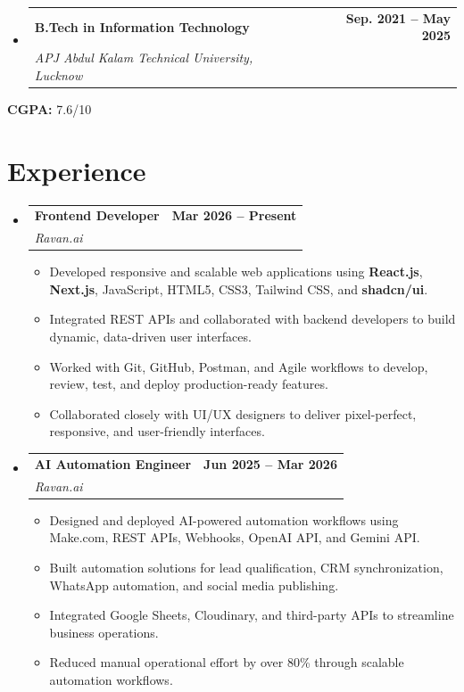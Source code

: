 \documentclass[letterpaper,11pt]{article}
\makeatletter
\newcommand{\resumeItem}[1]{
\item\small{{#1 \vspace{-2pt}}}
}
\newcommand{\resumeSubheading}[4]{
\vspace{-2pt}\item
\begin{tabular*}{1.0\textwidth}[t]{l@{\extracolsep{\fill}}r}
\textbf{#1} & \textbf{\small #2} \\
\textit{\small #3} & \textit{\small #4} \\
\end{tabular*}\vspace{-7pt}
}
\newcommand{\resumeSubHeadingListStart}{\begin{itemize}[leftmargin=0.0in,label={}]}
\newcommand{\resumeSubHeadingListEnd}{\end{itemize}}
\newcommand{\resumeItemListStart}{\begin{itemize}}
\newcommand{\resumeItemListEnd}{\end{itemize}\vspace{-5pt}}
\makeatother
\begin{document}
\resumeSubHeadingListStart

\resumeSubheading
{B.Tech in Information Technology}
{Sep. 2021 -- May 2025}
{APJ Abdul Kalam Technical University, Lucknow}
{}

\resumeSubHeadingListEnd

\textbf{CGPA:} 7.6/10


\section{Experience}

\resumeSubHeadingListStart

\resumeSubheading
{Frontend Developer}{Mar 2026 -- Present}
{Ravan.ai}{}

\resumeItemListStart

\resumeItem{Developed responsive and scalable web applications using \textbf{React.js}, \textbf{Next.js}, JavaScript, HTML5, CSS3, Tailwind CSS, and \textbf{shadcn/ui}.}
\resumeItem{Integrated REST APIs and collaborated with backend developers to build dynamic, data-driven user interfaces.}
\resumeItem{Worked with Git, GitHub, Postman, and Agile workflows to develop, review, test, and deploy production-ready features.}
\resumeItem{Collaborated closely with UI/UX designers to deliver pixel-perfect, responsive, and user-friendly interfaces.}

\resumeItemListEnd

\vspace{6pt}

\resumeSubheading
{AI Automation Engineer}{Jun 2025 -- Mar 2026}
{Ravan.ai}{}

\resumeItemListStart

\resumeItem{Designed and deployed AI-powered automation workflows using Make.com, REST APIs, Webhooks, OpenAI API, and Gemini API.}

\resumeItem{Built automation solutions for lead qualification, CRM synchronization, WhatsApp automation, and social media publishing.}

\resumeItem{Integrated Google Sheets, Cloudinary, and third-party APIs to streamline business operations.}

\resumeItem{Reduced manual operational effort by over 80\% through scalable automation workflows.}

\resumeItemListEnd

\resumeSubHeadingListEnd
\end{document}

